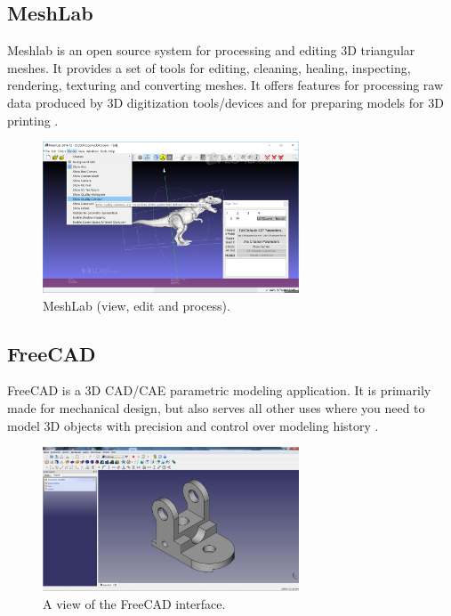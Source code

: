 \subsection{MeshLab}
Meshlab is an open source system for processing and editing 3D triangular meshes.
It provides a set of tools for editing, cleaning, healing, inspecting, rendering, texturing and converting meshes. It offers features for processing raw data produced by 3D digitization tools/devices and for preparing models for 3D printing \cite{meshlab}.

 \begin{figure}[!h]
\begin{center}
\includegraphics[width=3in]{figures02/meshlab.png}
\caption{MeshLab (view, edit and process).}
\end{center}
\end{figure}


\subsection{FreeCAD}
FreeCAD is a 3D CAD/CAE parametric modeling application. It is primarily made for mechanical design, but also serves all other uses where you need to model 3D objects with precision and control over modeling history \cite{freecad}.

 \begin{figure}[!h]
\begin{center}
\includegraphics[width=3in]{figures02/freecad.jpg}
\caption{A view of the FreeCAD interface.}
\end{center}
\end{figure}